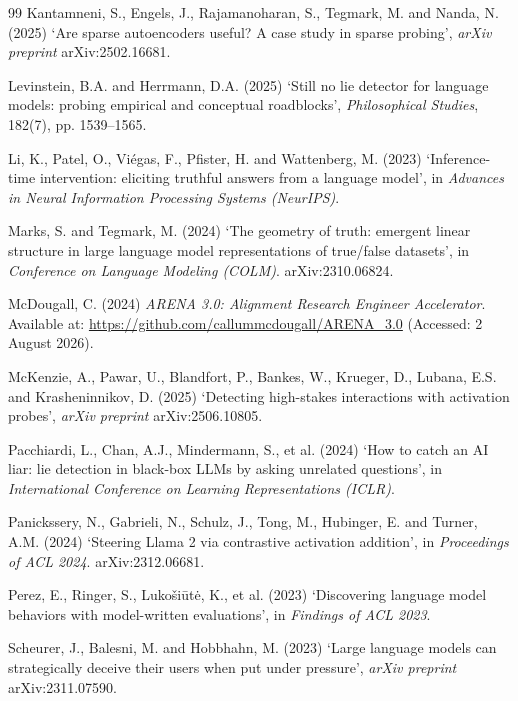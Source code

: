 \documentclass[conference]{IEEEtran}
\begin{document}
\begin{thebibliography}{99}
Kantamneni, S., Engels, J., Rajamanoharan, S., Tegmark, M. and Nanda, N. (2025) `Are sparse
autoencoders useful? A case study in sparse probing', \textit{arXiv preprint}
arXiv:2502.16681.

Levinstein, B.A. and Herrmann, D.A. (2025) `Still no lie detector for language
models: probing empirical and conceptual roadblocks',
\textit{Philosophical Studies}, 182(7), pp. 1539--1565.

Li, K., Patel, O., Vi\'egas, F., Pfister, H. and Wattenberg, M. (2023)
`Inference-time intervention: eliciting truthful answers from a language model',
in \textit{Advances in Neural Information Processing Systems (NeurIPS)}.

Marks, S. and Tegmark, M. (2024) `The geometry of truth: emergent linear
structure in large language model representations of true/false datasets', in
\textit{Conference on Language Modeling (COLM)}. arXiv:2310.06824.

McDougall, C. (2024) \textit{ARENA 3.0: Alignment Research Engineer
Accelerator}. Available at: \url{https://github.com/callummcdougall/ARENA_3.0}
(Accessed: 2 August 2026).

McKenzie, A., Pawar, U., Blandfort, P., Bankes, W., Krueger, D., Lubana, E.S.
and Krasheninnikov, D. (2025) `Detecting high-stakes interactions with
activation probes', \textit{arXiv preprint} arXiv:2506.10805.

Pacchiardi, L., Chan, A.J., Mindermann, S., et al. (2024) `How to catch an AI
liar: lie detection in black-box LLMs by asking unrelated questions', in
\textit{International Conference on Learning Representations (ICLR)}.

Panickssery, N., Gabrieli, N., Schulz, J., Tong, M., Hubinger, E. and Turner,
A.M. (2024) `Steering Llama 2 via contrastive activation addition', in
\textit{Proceedings of ACL 2024}. arXiv:2312.06681.

Perez, E., Ringer, S., Luko\v{s}i\=ut\.e, K., et al. (2023) `Discovering language
model behaviors with model-written evaluations', in \textit{Findings of ACL 2023}.

Scheurer, J., Balesni, M. and Hobbhahn, M. (2023) `Large language models can
strategically deceive their users when put under pressure',
\textit{arXiv preprint} arXiv:2311.07590.


\end{thebibliography}
\end{document}

